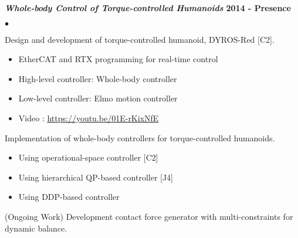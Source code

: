 \documentclass[margin,line]{res}
\newenvironment{list2}{
  \begin{list}{$\bullet$}{%
      \setlength{\itemsep}{0in}
      \setlength{\parsep}{0in} \setlength{\parskip}{0in}
      \setlength{\topsep}{0in} \setlength{\partopsep}{0in} 
      \setlength{\leftmargin}{0.2in}}}{\end{list}}
\begin{document}
\begin{resume}
\vspace{-.3cm}
\textbf{\emph { Whole-body Control of Torque-controlled Humanoids}} \hfill {\bf 2014 - Presence}
\begin{list2}
\item Design and development of torque-controlled humanoid, DYROS-Red [C2].
\begin{itemize}
\vspace*{-.05in}
\item[\checkmark] EtherCAT and RTX programming for real-time control
\vspace*{-.05in}
\item[\checkmark] High-level controller: Whole-body controller
\vspace*{-.05in}
\item[\checkmark] Low-level controller: Elmo motion controller
\vspace*{-.05in}
\item[\checkmark] Video : \url{https://youtu.be/01E-rKixNfE}
\vspace*{-.05in}
\end{itemize}
\item Implementation of whole-body controllers for torque-controlled humanoids.
\begin{itemize}
\vspace*{-.05in}
\item[\checkmark] Using operational-space controller [C2]
\vspace*{-.05in}
\item[\checkmark] Using hierarchical QP-based controller [J4]
\vspace*{-.05in}
\item[\checkmark] Using DDP-based controller
\vspace*{-.05in}
\end{itemize}
\item (Ongoing Work) Development contact force generator with multi-constraints for dynamic balance. 
\end{list2}


\end{resume}
\end{document}

